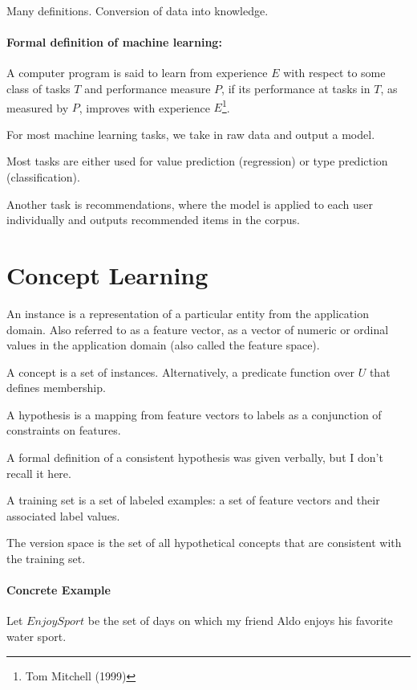 \documentclass{idc_msc}
\begin{document}
Many definitions. Conversion of data into knowledge.

\paragraph{Formal definition of machine learning:}

A computer program is said to learn from experience $E$ with respect to some class of tasks $T$ and performance measure $P$, if its performance at tasks in $T$, as measured by $P$, improves with experience $E$\footnote{Tom Mitchell (1999)}.

For most machine learning tasks, we take in raw data and output a model.

Most tasks are either used for value prediction (regression) or type prediction (classification).

Another task is recommendations, where the model is applied to each user individually and outputs recommended items in the corpus.

\section{Concept Learning}

An instance is a representation of a particular entity from the application domain. Also referred to as a feature vector, as a vector of numeric or ordinal values in the application domain (also called the feature space).

A concept is a set of instances. Alternatively, a predicate function over $U$ that defines membership.

A hypothesis is a mapping from feature vectors to labels as a conjunction of constraints on features.

A formal definition of a consistent hypothesis was given verbally, but I don't recall it here.

A training set is a set of labeled examples: a set of feature vectors and their associated label values.

The version space is the set of all hypothetical concepts that are consistent with the training set.

\paragraph{Concrete Example}

Let $EnjoySport$ be the set of days on which my friend Aldo enjoys his favorite water sport.
\end{document}

